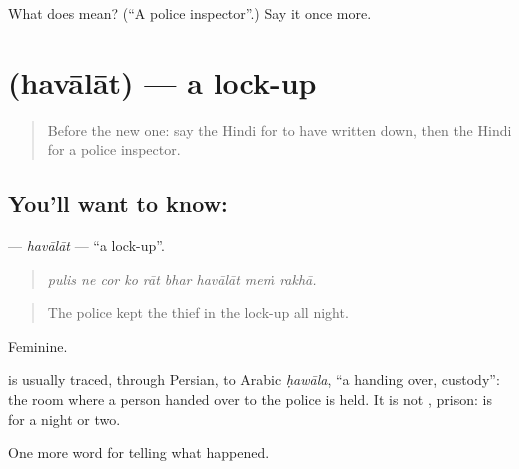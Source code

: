 \begin{tcolorbox}[breakable,colback=teal!4,colframe=teal!35!black,title={Before you move on}]
What does  mean? (\textquotedblleft{}A police inspector\textquotedblright{}.) Say it once more.
\end{tcolorbox}
\section[\texorpdfstring{\hi{हवालात} (havālāt)}{हवालात (havālāt)}]{ (havālāt) — a lock-up}

\label{lesson:HI-C290-havalat}



\begin{quote}
Before the new one: say the Hindi for to have written down, then the Hindi for a police inspector.
\end{quote}

\subsection*{You'll want to know: }
\textbf{} — \emph{havālāt} — \textquotedblleft{}a lock-up\textquotedblright{}.

\begin{quote}
        
\end{quote}

\begin{quote}
\emph{pulis ne cor ko rāt bhar havālāt meṁ rakhā.}
\end{quote}

\begin{quote}
The police kept the thief in the lock-up all night.
\end{quote}

Feminine.

\begin{cousinweb}
is usually traced, through Persian, to Arabic \emph{ḥawāla}, \textquotedblleft{}a handing over, custody\textquotedblright{}: the room where a person handed over to the police is held. It is not \textbf{}, prison: \textbf{} is for a night or two.
\end{cousinweb}

\begin{grammarlens}[title={What you've built}]
One more word for telling what happened.
\end{grammarlens}

